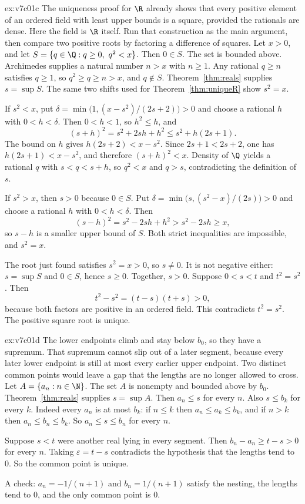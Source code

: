 \begin{solution}{ex:v7c01c}
\idea The uniqueness proof for $\R$ already shows that every positive element of an ordered field with least upper bounds is a square, provided the rationals are dense. Here the field is $\R$ itself. Run that construction as the main argument, then compare two positive roots by factoring a difference of squares.
\writeup Let $x>0$, and let $S=\{q\in\Q:q\ge 0,\ q^2<x\}$. Then $0\in S$. The set is bounded above. Archimedes supplies a natural number $n>x$ with $n\ge 1$. Any rational $q\ge n$ satisfies $q\ge 1$, so $q^2\ge q\ge n>x$, and $q\notin S$. Theorem~\ref{thm:reals} supplies $s=\sup S$. The same two shifts used for Theorem~\ref{thm:uniqueR} show $s^2=x$.

If $s^2<x$, put $\delta=\min\bigl(1,(x-s^2)/(2s+2)\bigr)>0$ and choose a rational $h$ with $0<h<\delta$. Then $0<h<1$, so $h^2\le h$, and
\[
(s+h)^2=s^2+2sh+h^2\le s^2+h(2s+1).
\]
The bound on $h$ gives $h(2s+2)<x-s^2$. Since $2s+1<2s+2$, one has $h(2s+1)<x-s^2$, and therefore $(s+h)^2<x$.
Density of $\Q$ yields a rational $q$ with $s<q<s+h$, so $q^2<x$ and $q>s$, contradicting the definition of $s$.

If $s^2>x$, then $s>0$ because $0\in S$. Put $\delta=\min\bigl(s,(s^2-x)/(2s)\bigr)>0$ and choose a rational $h$ with $0<h<\delta$. Then
\[
(s-h)^2=s^2-2sh+h^2>s^2-2sh\ge x,
\]
so $s-h$ is a smaller upper bound of $S$. Both strict inequalities are impossible, and $s^2=x$.

The root just found satisfies $s^2=x>0$, so $s\ne 0$. It is not negative either: $s=\sup S$ and $0\in S$, hence $s\ge 0$. Together, $s>0$. Suppose $0<s<t$ and $t^2=s^2$. Then
\[
t^2-s^2=(t-s)(t+s)>0,
\]
because both factors are positive in an ordered field. This contradicts $t^2=s^2$. The positive square root is unique.
\end{solution}

\begin{solution}{ex:v7c01d}
\idea The lower endpoints climb and stay below $b_0$, so they have a supremum. That supremum cannot slip out of a later segment, because every later lower endpoint is still at most every earlier upper endpoint. Two distinct common points would leave a gap that the lengths are no longer allowed to cross.
\writeup Let $A=\{a_n:n\in\N\}$. The set $A$ is nonempty and bounded above by $b_0$. Theorem~\ref{thm:reals} supplies $s=\sup A$. Then $a_n\le s$ for every $n$. Also $s\le b_k$ for every $k$. Indeed every $a_n$ is at most $b_k$: if $n\le k$ then $a_n\le a_k\le b_k$, and if $n>k$ then $a_n\le b_n\le b_k$. So $a_n\le s\le b_n$ for every $n$.

Suppose $s<t$ were another real lying in every segment. Then $b_n-a_n\ge t-s>0$ for every $n$. Taking $\varepsilon=t-s$ contradicts the hypothesis that the lengths tend to $0$. So the common point is unique.

A check: $a_n=-1/(n+1)$ and $b_n=1/(n+1)$ satisfy the nesting, the lengths tend to $0$, and the only common point is $0$.
\end{solution}

